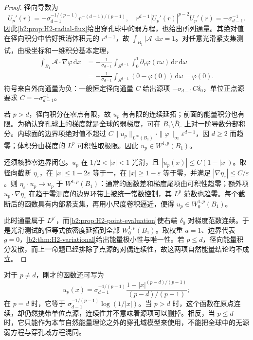 \begin{proof}
径向导数为
\[
 U_p'(r)=-\sigma_{d-1}^{-1/(p-1)}r^{-(d-1)/(p-1)},
 \quad r^{d-1}|U_p'(r)|^{p-2}U_p'(r)=-\sigma_{d-1}^{-1}.
\]
因此\cref{b2:prop:H2-radial-flux}给出穿孔球中的弱方程，也给出所列通量。其绝对值在径向积分中恰好抵消体积元的 \(r^{d-1}\)，故
\(\int_{B_1}|\mathcal A|\,\mathrm dx=1\)。对任意光滑紧支集测试，由极坐标和一维积分基本定理，
\begin{align*}
 \int_{B_1}\mathcal A\cdot\nabla\varphi\,\mathrm dx
 &=-\frac1{\sigma_{d-1}}\int_{S^{d-1}}\int_0^1
          \partial_r\varphi(r\omega)\,\mathrm dr\,\mathrm d\omega\\
 &=-\frac1{\sigma_{d-1}}\int_{S^{d-1}}
            (0-\varphi(0))\,\mathrm d\omega
 =\varphi(0).
\end{align*}
符号来自外向通量为负：一般恒定径向通量 \(C\) 给出源项 \(-\sigma_{d-1}C\delta_0\)，单位正点源要求 \(C=-\sigma_{d-1}^{-1}\)。

若 \(p>d\)，径向积分在零点有限，故 \(u_p\) 有有限的连续延拓；前面的能量积分也有限。为确认穿孔球上的梯度就是全球的弱梯度，可在 \(B_1\setminus\overline B_\varepsilon\) 上对一阶导数分部积分。内球面的边界项绝对值不超过
\(C\|u_p\|_{L^\infty(B_1)}\cdot\|\varphi\|_\infty\varepsilon^{d-1}\)，因 \(d\ge2\) 而趋零；体积分由梯度的 \(L^p\) 可积性取极限。因此 \(u_p\in W^{1,p}(B_1)\)。

还须核验零边界闭包。\(u_p\) 在 \(1/2<|x|<1\) 光滑，且 \(|u_p(x)|\le C(1-|x|)\)。取径向截断 \(\eta_\varepsilon\)，在 \(|x|\le1-2\varepsilon\) 等于一，在 \(|x|\ge1-\varepsilon\) 等于零，并满足 \(|\nabla\eta_\varepsilon|\le C/\varepsilon\)。则 \(\eta_\varepsilon\cdot u_p\to u_p\) 于 \(W^{1,p}(B_1)\)：通常的函数差和梯度尾项由可积性趋零；额外项 \(u_p\cdot\nabla\eta_\varepsilon\) 在趋于零测度的边界环带上被统一常数控制，其 \(L^p\) 范数也趋零。每个截断后的函数具有内部紧支集，再用小尺度卷积逼近，便得 \(u_p\in W_0^{1,p}(B_1)\)。

此时通量属于 \(L^{p'}\)，而\cref{b2:prop:H2-point-evaluation}使右端 \(\delta_0\) 对梯度范数连续。于是光滑测试的恒等式依密度延拓到全部 \(W_0^{1,p}(B_1)\)。取权重 \(a=1\)、边界代表 \(g=0\)，\cref{b2:thm:H2-variational}给出能量极小性与唯一性。若 \(p\le d\)，径向能量积分发散，而上一命题已经排除了点源的对偶连续性，故这两项自然能量结论均不成立。
\end{proof}

对于 \(p\ne d\)，刚才的函数还可写为
\[
 u_p(x)=\sigma_{d-1}^{-1/(p-1)}
       \frac{1-|x|^{(p-d)/(p-1)}}{(p-d)/(p-1)};
\]
在 \(p=d\) 时，它等于 \(\sigma_{d-1}^{-1/(p-1)}\log(1/|x|)\)。当 \(p>d\) 时，这个函数在原点连续，却仍然携带单位点源，连续性并不意味着源项可以删掉。相反，当 \(p\le d\) 时，它只能作为本节自然能量理论之外的穿孔域模型来使用，不能把全球中的无源弱方程与穿孔域方程混同。

